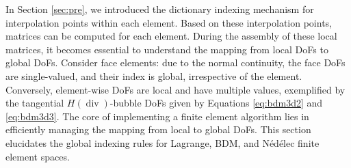 \documentclass[12pt, a4paper]{article}
\renewcommand{\div}{\operatorname{div}}
\begin{document}
In Section \ref{sec:pre}, we introduced the dictionary indexing mechanism for
interpolation points within each element. Based on these interpolation points,
matrices can be computed for each element. During the assembly of these local
matrices, it becomes essential to understand the mapping from local DoFs to
global DoFs. Consider face elements: due to the normal continuity, the face DoFs
are single-valued, and their index is global, irrespective of the element.
Conversely, element-wise DoFs are local and have multiple values, exemplified by
the tangential \(H(\div)\)-bubble DoFs given by Equations \eqref{eq:bdm3d2} and
\eqref{eq:bdm3d3}. The core of implementing a finite element algorithm lies in
efficiently managing the mapping from local to global DoFs. This section
elucidates the global indexing rules for Lagrange, BDM, and N\'ed\'elec finite
element spaces.
\end{document}

